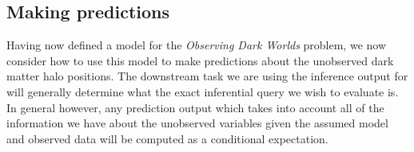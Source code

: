
\subsection{Making predictions}

Having now defined a model for the \emph{Observing Dark Worlds} problem, we now consider how to use this model to make predictions about the unobserved dark matter halo positions. The downstream task we are using the inference output for will generally determine what the exact inferential query we wish to evaluate is. In general however, any prediction output which takes into account all of the information we have about the unobserved variables given the assumed model and observed data will be computed as a conditional expectation.

